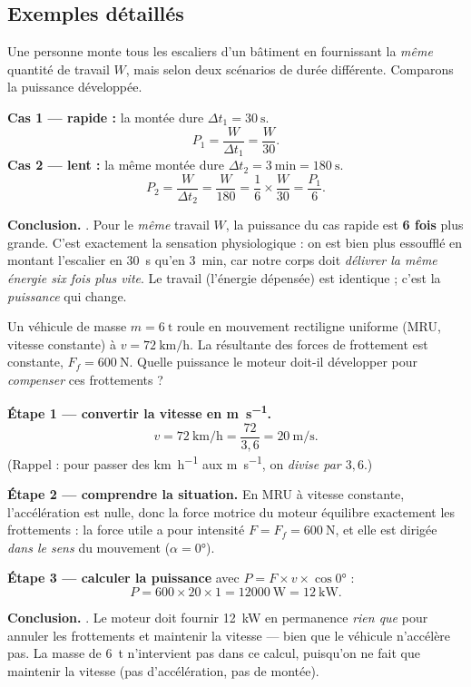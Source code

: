 \documentclass[11pt,a4paper]{article}
\begin{document}
\subsection{Exemples détaillés}

\begin{exemple}
Une personne monte tous les escaliers d'un bâtiment en fournissant la \emph{même} quantité de
travail $W$, mais selon deux scénarios de durée différente. Comparons la puissance développée.

\smallskip
\textbf{Cas 1 — rapide :} la montée dure $\Delta t_1=\SI{30}{\second}$.
\[
P_1=\frac{W}{\Delta t_1}=\frac{W}{30}.
\]
\textbf{Cas 2 — lent :} la même montée dure $\Delta t_2=\SI{3}{\minute}=\SI{180}{\second}$.
\[
P_2=\frac{W}{\Delta t_2}=\frac{W}{180}=\frac{1}{6}\times\frac{W}{30}=\frac{P_1}{6}.
\]

\textbf{Conclusion.} . Pour le \emph{même} travail $W$, la puissance du cas
rapide est \textbf{6 fois} plus grande. C'est exactement la sensation physiologique : on est bien
plus essoufflé en montant l'escalier en \SI{30}{\second} qu'en \SI{3}{\minute}, car notre corps doit
\emph{délivrer la même énergie six fois plus vite}. Le travail (l'énergie dépensée) est identique ;
c'est la \emph{puissance} qui change.
\end{exemple}

\begin{exemple}
Un véhicule de masse $m=\SI{6}{\tonne}$ roule en mouvement rectiligne uniforme (MRU, vitesse
constante) à $v=\SI{72}{\kilo\metre\per\hour}$. La résultante des forces de frottement est constante,
$F_f=\SI{600}{\newton}$. Quelle puissance le moteur doit-il développer pour \emph{compenser} ces
frottements ?

\smallskip
\textbf{Étape 1 — convertir la vitesse en \si{\metre\per\second}.}
\[
v=\SI{72}{\kilo\metre\per\hour}=\frac{72}{3{,}6}=\SI{20}{\metre\per\second}.
\]
(Rappel : pour passer des \si{\kilo\metre\per\hour} aux \si{\metre\per\second}, on \emph{divise par
$3{,}6$}.)

\textbf{Étape 2 — comprendre la situation.} En MRU à vitesse constante, l'accélération est nulle,
donc la force motrice du moteur équilibre exactement les frottements : la force utile a pour
intensité $F=F_f=\SI{600}{\newton}$, et elle est dirigée \emph{dans le sens} du mouvement
($\alpha=\ang{0}$).

\textbf{Étape 3 — calculer la puissance} avec $P=F\times v\times\cos\ang{0}$ :
\[
P=600\times 20\times 1=\SI{12000}{\watt}=\SI{12}{\kilo\watt}.
\]

\textbf{Conclusion.} . Le moteur doit fournir \SI{12}{\kilo\watt} en
permanence \emph{rien que} pour annuler les frottements et maintenir la vitesse — bien que le
véhicule n'accélère pas. La masse de \SI{6}{\tonne} n'intervient pas dans ce calcul, puisqu'on ne
fait que maintenir la vitesse (pas d'accélération, pas de montée).
\end{exemple}
\end{document}
